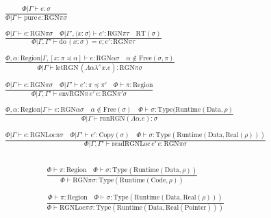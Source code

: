 \documentclass {article}
\begin{document}
\begin{gather*}
\frac
{\Phi | \Gamma \vdash e : \sigma }
{\Phi | \Gamma \vdash \text{pure} \, e : \text{RGN} \pi \sigma } \\
\\
\frac
{\Phi | \Gamma \vdash e : \text{RGN} \pi \sigma \quad \Phi | \Gamma', \langle x : \sigma \rangle \vdash e' : \text{RGN} \pi \tau \quad \text{RT}(\sigma) }
{\Phi | \Gamma, \Gamma' \vdash \text{do} \, (x : \sigma) = e; e' : \text{RGN} \pi \tau} \\
\\
\frac
{\Phi , \alpha : \text{Region} | \Gamma, [x : \pi \preceq \alpha] \vdash e : \text{RGN} \alpha \sigma \quad \alpha \notin \text{Free}(\sigma, \pi)}
{\Phi | \Gamma \vdash \text{letRGN} \, (\Lambda \alpha \lambda^\wedge x. e) : \text{RGN} \pi \sigma} \\
\\
\frac
{\Phi | \Gamma \vdash e : \text{RGN} \pi \sigma \quad \Phi | \Gamma' \vdash e' : \pi \preceq \pi' \quad \Phi \vdash \pi : \text{Region}}
{\Phi | \Gamma, \Gamma' \vdash \text{envRGN} \pi \, e' \, e : \text{RGN} \pi' \sigma } \\
\\
\frac
{\Phi, \alpha : \text{Region}| \Gamma \vdash e : \text{RGN} \alpha \sigma \quad \alpha \notin \text{Free}(\sigma) \quad \Phi \vdash \sigma : \text{Type}(\text{Runtime}(\text{Data}, \rho)}
{\Phi | \Gamma \vdash \text{runRGN} (\Lambda \alpha. e) : \sigma}\\
\\
\frac
{\Phi | \Gamma \vdash e : \text{RGNLoc} \pi \sigma \quad \Phi | \Gamma' \vdash e' : \text{Copy} (\sigma) \quad \Phi \vdash \sigma : \text{Type}(\text{Runtime}(\text{Data}, \text{Real}(\rho))) }
{\Phi | \Gamma, \Gamma' \vdash \text{readRGNLoc} \, e' \, e : \text{RGN} \pi \sigma} \\
\end{gather*}

\begin{gather*}
\frac
{\Phi \vdash \pi : \text{Region} \quad \Phi \vdash \sigma : \text{Type}(\text{Runtime}(\text{Data}, \rho))}
{\Phi \vdash \text{RGN} \pi \sigma : \text{Type}(\text{Runtime}(\text{Code}, \rho))} \\
\\
\frac
{\Phi \vdash \pi : \text{Region} \quad \Phi \vdash \sigma : \text{Type}(\text{Runtime}(\text{Data}, \text{Real}(\rho)))}
{\Phi \vdash \text{RGNLoc} \pi \sigma : \text{Type}(\text{Runtime} (\text{Data}, \text{Real}(\text{Pointer})))} \\
\end{gather*}
\end{document}

